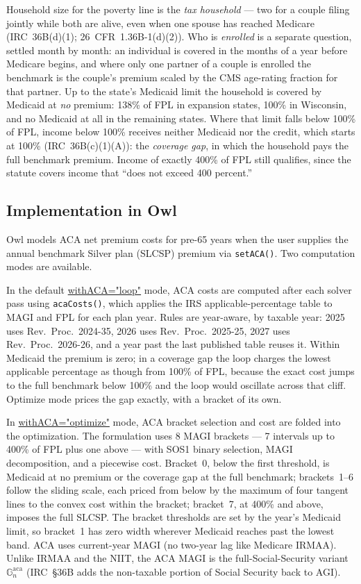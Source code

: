 \documentclass[fleqn,12pt]{report}
\newcommand{\code}[1]{\url{#1}}
\begin{document}
Household size for the poverty line is the \emph{tax household} --- two for a couple
filing jointly while both are alive, even when one spouse has reached Medicare
(IRC~36B(d)(1); 26~CFR~1.36B-1(d)(2)).  Who is \emph{enrolled} is a separate question,
settled month by month: an individual is covered in the months of a year before Medicare
begins, and where only one partner of a couple is enrolled the benchmark is the couple's
premium scaled by the CMS age-rating fraction for that partner.
Up to the state's Medicaid limit the household is covered by Medicaid at \emph{no} premium:
138\% of FPL in expansion states, 100\% in Wisconsin, and no Medicaid at all in the
remaining states.  Where that limit falls below 100\% of FPL, income below 100\% receives
neither Medicaid nor the credit, which starts at 100\% (IRC~36B(c)(1)(A)): the
\emph{coverage gap}, in which the household pays the full benchmark premium.
Income of exactly 400\% of FPL still qualifies, since the statute covers income that
``does not exceed 400 percent.''

\subsection*{Implementation in Owl}

Owl models ACA net premium costs for pre-65 years when the user supplies the
annual benchmark Silver plan (SLCSP) premium via \texttt{setACA()}.
Two computation modes are available.

In the default \code{withACA="loop"} mode, ACA costs are computed after each
solver pass using \texttt{acaCosts()}, which applies the IRS applicable-percentage
table to MAGI and FPL for each plan year.
Rules are year-aware, by taxable year: 2025 uses Rev.\ Proc.\ 2024-35, 2026 uses
Rev.\ Proc.\ 2025-25, 2027 uses Rev.\ Proc.\ 2026-26, and a year past the last published
table reuses it.
Within Medicaid the premium is zero; in a coverage gap the loop charges the lowest
applicable percentage as though from 100\% of FPL, because the exact cost jumps to the
full benchmark below 100\% and the loop would oscillate across that cliff.
Optimize mode prices the gap exactly, with a bracket of its own.

In \code{withACA="optimize"} mode, ACA bracket selection and cost are folded into
the optimization.
The formulation uses 8 MAGI brackets --- 7 intervals up to 400\% of FPL plus one above
--- with SOS1 binary selection, MAGI decomposition, and a piecewise cost.
Bracket~0, below the first threshold, is Medicaid at no premium or the coverage gap at the
full benchmark; brackets~1--6 follow the sliding scale, each priced from below by the
maximum of four tangent lines to the convex cost within the bracket; bracket~7, at 400\%
and above, imposes the full SLCSP.
The bracket thresholds are set by the year's Medicaid limit, so bracket~1 has zero width
wherever Medicaid reaches past the lowest band.
ACA uses current-year MAGI (no two-year lag like Medicare IRMAA). Unlike IRMAA and
the NIIT, the ACA MAGI is the full-Social-Security variant $\mathbb{G}^{\mathrm{aca}}_n$
(IRC~§36B adds the non-taxable portion of Social Security back to AGI).
\end{document}
